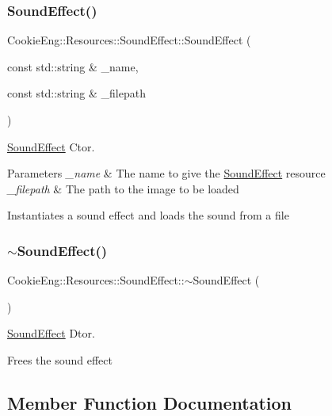 \subsubsection{\texorpdfstring{Sound\+Effect()}{SoundEffect()}\hspace{0.1cm}{\footnotesize\ttfamily [2/2]}}
{\footnotesize\ttfamily Cookie\+Eng\+::\+Resources\+::\+Sound\+Effect\+::\+Sound\+Effect (\begin{DoxyParamCaption}\item[{const std\+::string \&}]{\+\_\+name,  }\item[{const std\+::string \&}]{\+\_\+filepath }\end{DoxyParamCaption})}



\hyperlink{class_cookie_eng_1_1_resources_1_1_sound_effect}{Sound\+Effect} Ctor. 


\begin{DoxyParams}{Parameters}
{\em \+\_\+name} & The name to give the \hyperlink{class_cookie_eng_1_1_resources_1_1_sound_effect}{Sound\+Effect} resource \\
\hline
{\em \+\_\+filepath} & The path to the image to be loaded\\
\hline
\end{DoxyParams}
Instantiates a sound effect and loads the sound from a file \mbox{\label{class_cookie_eng_1_1_resources_1_1_sound_effect_a5bae1940555d6e731693a74bc1737f4a}} 
\subsubsection{\texorpdfstring{$\sim$\+Sound\+Effect()}{~SoundEffect()}}
{\footnotesize\ttfamily Cookie\+Eng\+::\+Resources\+::\+Sound\+Effect\+::$\sim$\+Sound\+Effect (\begin{DoxyParamCaption}{ }\end{DoxyParamCaption})}



\hyperlink{class_cookie_eng_1_1_resources_1_1_sound_effect}{Sound\+Effect} Dtor. 

Frees the sound effect 

\subsection{Member Function Documentation}
\mbox{\label{class_cookie_eng_1_1_resources_1_1_sound_effect_a702862c8bf0f69c19ef5e680f0e18ca0}} 
